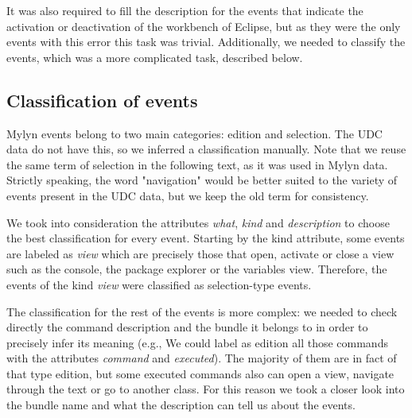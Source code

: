 \documentclass[times]{smrauth}
\begin{document}
It was also required to fill the description for the events that indicate the activation or deactivation of the workbench of Eclipse, but as they were the only events with this error this task was trivial. Additionally, we needed to classify the events, which was a more complicated task, described below.


\subsection{Classification of events}
Mylyn events belong to two main categories: edition and selection. The UDC data do not have this, so we inferred a classification manually. Note that we reuse the same term of selection in the following text, as it was used in Mylyn data. Strictly speaking, the word "navigation" would be better suited to the variety of events present in the UDC data, but we keep the old term for consistency.

We took into consideration the attributes \textit{what}, \textit{kind} and \textit{description} to choose the best classification for every event. Starting by the kind attribute, some events are labeled as \textit{view} which are precisely those that open, activate or close a view such as the console, the package explorer or the variables view. Therefore, the events of the kind \textit{view} were classified as selection-type events.

The classification for the rest of the events is more complex: we needed to check directly the command description and the bundle it belongs to in order to precisely infer its meaning (e.g., We could label as edition all those commands with the attributes \textit{command} and \textit{executed}). The majority of them are in fact of that type edition, but some executed commands also can open a view, navigate through the text or go to another class. For this reason we took a closer look into the bundle name and what the description can tell us about the events.
\end{document}
